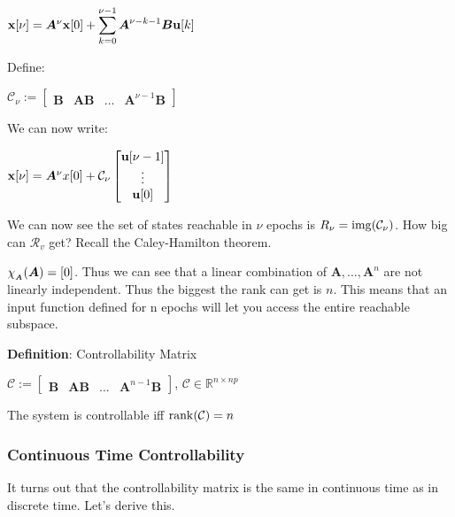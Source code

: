 \documentclass[11pt]{article}
\begin{document}
  \(\mathbf{x}[\nu] = \bm{A}^{\nu}\mathbf{x}[0] +  \displaystyle
  \sum_{k = 0}^{\nu - 1} \bm{A}^{\nu - k - 1}\bm{B}\mathbf{u}[k]\)

  \pagebreak

  Define:

  \(\mathcal{C}_{\nu} := \begin{bmatrix} \bm{B} & \bm{AB} & \dots & \bm{A}^{\nu - 1}\bm{B}\end{bmatrix}\)

  \vspace{12pt}

  We can now write:

  \(\mathbf{x}[\nu] = \bm{A}^{\nu}x[0] +
  \mathcal{C}_{\nu}
  \begin{bmatrix} \mathbf{u}[\nu - 1] \\ \vdots \\ \mathbf{u}[0] \end{bmatrix}\)

  \vspace{12pt}

  We can now see the set of states reachable in \(\nu\) epochs is \(R_{\nu} = \mathrm{img}{\left( \mathcal{C}_{\nu} \right)}\).
  How big can \(\mathcal{R}_v\) get? Recall the Caley-Hamilton theorem.

  \(\chi_{_{\bm{A}}}(\bm{A}) = [0]\). Thus we can see that a linear combination of \(\bm{A}, \dots, \bm{A}^n\) are
  not linearly independent. Thus the biggest the rank can get is \(n\). This means that
  an input function defined for n epochs will let you access the entire reachable subspace.

  \vspace{12pt}

  \textbf{Definition}: Controllability Matrix

  \(\mathcal{C} := \begin{bmatrix} \bm{B} & \bm{AB} & \dots & \bm{A}^{n - 1}\bm{B}\end{bmatrix}\),
  \(\mathcal{C} \in \mathbb{R}^{n \times np}\)

  The system is controllable iff \(\rank(\mathcal{C}) = n\)

  \pagebreak

  \subsubsection{Continuous Time Controllability}

  It turns out that the controllability matrix is the same in continuous time as in discrete time.
  Let's derive this.
\end{document}
